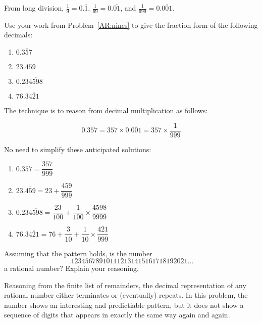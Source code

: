 \documentclass{ximera}
\begin{document}
\begin{teachingnote}
From long division, $\frac{1}{9} = 0.\overline{1}$, $\frac{1}{99} = 0.\overline{01}$, and $\frac{1}{999} = 0.\overline{001}$.  
\end{teachingnote}

\begin{problem}
Use your work from Problem~\ref{AR:nines} to give the fraction form of
the following decimals:
\begin{enumerate}
\item $0.\overline{357}$
\item $23.\overline{459}$
\item $0.23\overline{4598}$
\item $76.3\overline{421}$
\end{enumerate}
\end{problem}

\begin{teachingnote}
The technique is to reason from decimal multiplication as follows:  

$$0.\overline{357} = 357\times  0.\overline{001} = 357 \times \frac{1}{999}$$

No need to simplify these anticipated solutions: 
\begin{enumerate}
\item $0.\overline{357} = \dfrac{357}{999}$
\item $23.\overline{459} = 23 + \dfrac{459}{999}$
\item $0.23\overline{4598} = \dfrac{23}{100}+ \dfrac{1}{100}\times\dfrac{4598}{9999}$
\item $76.3\overline{421} = 76 + \dfrac{3}{10}+ \dfrac{1}{10}\times\dfrac{421}{999}$
\end{enumerate}
\end{teachingnote}

\begin{problem} 
Assuming that the pattern holds, is the number
\[
.123456789101112131415161718192021\dots
\]
a rational number? Explain your reasoning.
\end{problem}

\begin{teachingnote}
Reasoning from the finite list of remainders, the decimal representation of any rational number either terminates or (eventually) repeats.  In this problem, the number shows an interesting and predictiable pattern, but it does not show a sequence of digits that appears in exactly the same way again and again.  
\end{teachingnote}
\end{document}
